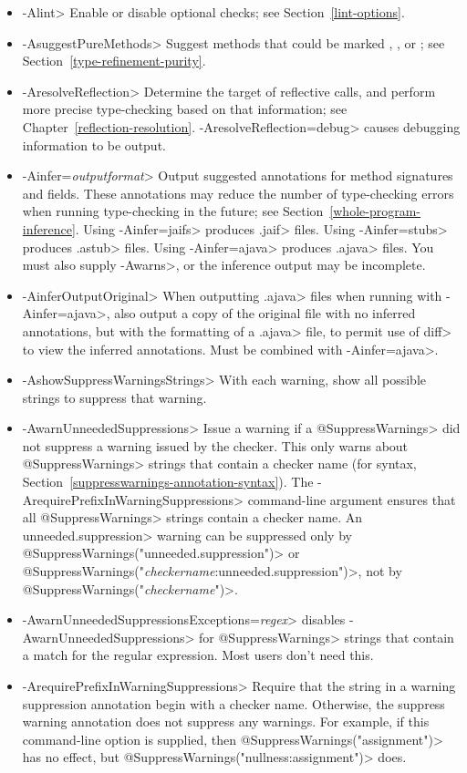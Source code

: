 \begin{itemize}
\item \<-Alint>
  Enable or disable optional checks; see Section~\ref{lint-options}.
\item \<-AsuggestPureMethods>
  Suggest methods that could be marked
  ,
  ,
  or ; see
  Section~\ref{type-refinement-purity}.
\item \<-AresolveReflection>
  Determine the target of reflective calls, and perform more precise
  type-checking based on that information; see
  Chapter~\ref{reflection-resolution}.  \<-AresolveReflection=debug> causes
  debugging information to be output.
\item \<-Ainfer=\emph{outputformat}>
  Output suggested annotations for method signatures and fields.
  These annotations may reduce the number of type-checking
  errors when running type-checking in the future; see
  Section~\ref{whole-program-inference}.
  Using \<-Ainfer=jaifs> produces \<.jaif> files.
  Using \<-Ainfer=stubs> produces \<.astub> files.
  Using \<-Ainfer=ajava> produces \<.ajava> files.
  You must also supply \<-Awarns>, or the inference output may be incomplete.
\item \<-AinferOutputOriginal>
  When outputting \<.ajava> files when running with \<-Ainfer=ajava>,
  also output a copy of the original file with no inferred annotations,
  but with the formatting of a \<.ajava> file, to permit use of \<diff>
  to view the inferred annotations. Must be combined with \<-Ainfer=ajava>.
\item \<-AshowSuppressWarningsStrings>
  With each warning, show all possible strings to suppress that warning.
\item \<-AwarnUnneededSuppressions>
  Issue a warning if a \<@SuppressWarnings> did not suppress a warning
  issued by the checker.  This only warns about
  \<@SuppressWarnings> strings that contain a checker name
  (for syntax, Section~\ref{suppresswarnings-annotation-syntax}).  The
  \<-ArequirePrefixInWarningSuppressions> command-line argument ensures
  that all \<@SuppressWarnings> strings contain a checker name.
  An \<unneeded.suppression> warning can be suppressed only by
  \<@SuppressWarnings("unneeded.suppression")>
  or \<@SuppressWarnings("\emph{checkername}:unneeded.suppression")>,
  not by \<@SuppressWarnings("\emph{checkername}")>.
\item \<-AwarnUnneededSuppressionsExceptions=\emph{regex}> disables
  \<-AwarnUnneededSuppressions> for \<@SuppressWarnings> strings that
  contain a match for the regular expression.  Most users don't need this.
\item \<-ArequirePrefixInWarningSuppressions>
  Require that the string in a warning suppression annotation begin with a checker
  name.  Otherwise, the suppress warning annotation does not
  suppress any warnings.  For example, if this command-line option is
  supplied, then \<@SuppressWarnings("assignment")> has no effect, but
  \<@SuppressWarnings("nullness:assignment")> does.
\end{itemize}

